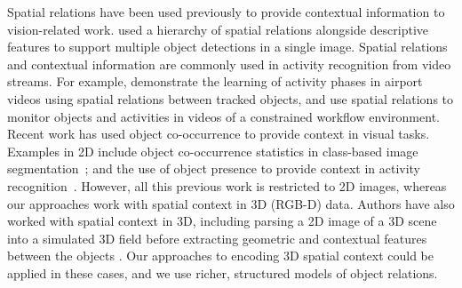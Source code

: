\documentclass[letterpaper, 10 pt, conference]{ieeeconf}  %
\begin{document}
Spatial relations have been used previously to provide contextual information to vision-related work. \cite{MyungJin:CVPR2010}used a hierarchy of spatial relations alongside descriptive features to support multiple object detections in a single image. Spatial relations and contextual information are commonly used in activity recognition from video streams. For example, \cite{Krishna:ECAI2010} demonstrate the learning of activity phases in airport videos using spatial relations between tracked objects, and \cite{Behera2012} use spatial relations to monitor objects and activities in videos of a constrained workflow environment. Recent work has used object co-occurrence to provide context in visual  tasks. Examples in 2D include object co-occurrence statistics in class-based image segmentation~\cite{Ladicky:IJCV2013}; and the use of object presence to provide context in activity recognition~\cite{Li:2012}. However, all this previous work is restricted to 2D images, whereas our approaches work with spatial context in 3D (RGB-D) data. Authors have also worked with spatial context in 3D, including parsing a 2D image of a 3D scene into a simulated 3D field before extracting geometric and contextual features between the objects \cite{Xiao:SIGGRAPH2012}. Our approaches to encoding 3D spatial context could be applied in these cases, and we use richer, structured models of object relations.
\end{document}
